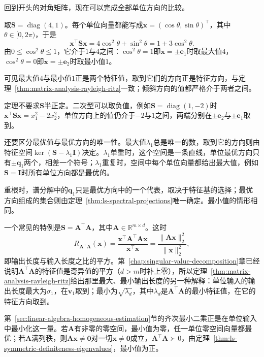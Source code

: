 回到开头的对角矩阵，现在可以完成全部单位方向的比较。

\begin{example}[对角矩阵在全部单位方向上的比较]
\label{ex:ls-rayleigh-diagonal-two-by-two}
取$\bm S=\operatorname{diag}(4,1)$。每个单位向量都能写成$\bm x=(\cos\theta,\sin\theta)^\top$，其中$\theta\in[0,2\pi)$，于是
\[
 \bm x^\top\bm S\bm x=4\cos^2\theta+\sin^2\theta=1+3\cos^2\theta .
\]
由$0\leq\cos^2\theta\leq1$，它介于$1$与$4$之间：$\cos^2\theta=1$即$\bm x=\pm\bm e_1$时取最大值$4$，$\cos^2\theta=0$即$\bm x=\pm\bm e_2$时取最小值$1$。

可见最大值$4$与最小值$1$正是两个特征值，取到它们的方向正是特征方向，与定理~\ref{thm:matrix-analysis-rayleigh-ritz}一致；倾斜方向的值都严格介于两者之间。
\end{example}

定理不要求$\bm S$半正定。二次型可以取负值，例如$\bm S=\operatorname{diag}(1,-2)$时$\bm x^\top\bm S\bm x=x_1^2-2x_2^2$，单位方向上的值仍介于$-2$与$1$之间，两端分别在$\pm\bm e_2$与$\pm\bm e_1$取到。

还要区分最优值与最优方向的唯一性。最大值$\lambda_1$总是唯一的数，取到它的方向则由特征空间$\ker(\bm S-\lambda_1\bm I)$决定。$\lambda_1$单重时，这个空间是一条直线，单位最优方向只有$\pm\bm q_1$两个，相差一个符号；$\lambda_1$重复时，空间中每个单位向量都给出最大值，例如$\bm S=\bm I$时所有单位方向都是最优的。

重根时，谱分解中的$\bm q_1$只是最优方向中的一个代表，取决于特征基的选择；最优方向组成的集合则由定理~\ref{thm:ls-spectral-projections}唯一确定。最小值的情形相同。

一个常见的特例是$\bm S=\bm A^\top\bm A$，其中$\bm A\in\mathbb R^{m\times d}$。这时
\[
 R_{\bm A^\top\bm A}(\bm x)=\frac{\bm x^\top\bm A^\top\bm A\bm x}{\bm x^\top\bm x}=\frac{\lVert\bm A\bm x\rVert_2^2}{\lVert\bm x\rVert_2^2},
\]
即输出长度与输入长度之比的平方。第~\ref{chap:singular-value-decomposition}章已经说明$\bm A^\top\bm A$的特征值是奇异值的平方（$d>m$时补上零），所以定理~\ref{thm:matrix-analysis-rayleigh-ritz}给出那里最大、最小输出长度的另一种解释：单位输入的输出长度最大为$\sigma_1$，在$\bm v_1$取到；最小为$\sqrt{\lambda_d}$，其中$\lambda_d$是$\bm A^\top\bm A$的最小特征值，在它的特征方向取到。

第~\ref{sec:linear-algebra-homogeneous-estimation}节的齐次最小二乘正是在单位输入中最小化这一量。若$\bm A$有非零的零空间，最小值为零，任一单位零空间向量都最优；若$\bm A$满列秩，则$\bm A\bm x\neq\bm0$对一切$\bm x\neq\bm0$成立，$\bm A^\top\bm A\succ0$，由定理~\ref{thm:ls-symmetric-definiteness-eigenvalues}，最小值为正。

